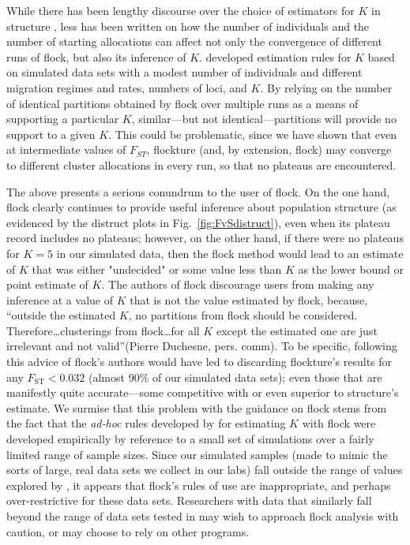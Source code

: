 While there has been lengthy 
discourse over the choice of estimators for $K$ in {\sc structure} 
\citep{Pritchardetal2000,Evannoetal2005,Wap&Gag2006,Gaoetal2011}, less has been written on how the number of 
individuals
and the number of starting allocations can affect not only the convergence of different runs of {\sc flock}, but also its 
inference of $K$. \citeauthor{Duc&Tur2012} developed estimation rules for $K$ based on simulated data 
sets with a modest number of individuals and different migration regimes and rates, numbers of loci, and $K$. 
By relying on the number of identical partitions obtained by {\sc flock} over multiple
runs as a means of supporting 
a particular $K$,  similar---but not identical---partitions
will provide no support to a given $K$. This could be problematic, 
since we have shown that even at intermediate
values of $F_{ST}$,  {\sc flockture} (and, by extension,
{\sc flock}) may converge to 
different cluster allocations in every run, so that no plateaus are encountered. 

The above presents a serious conundrum to the user of {\sc flock}.  On the one hand,
{\sc flock} clearly continues to provide useful inference about population structure
(as evidenced by the {\sc distruct} plots in Fig.~\ref{fig:FvSdistruct}), even when its
plateau record includes no plateaus; however, on the other hand, if there were no
plateaus for $K=5$ in our simulated data, then the {\sc flock} method would lead to an estimate of $K$ that
was either "undecided" or some value less than $K$ as the lower bound or point estimate of $K$. The authors of {\sc flock}
discourage users from making any inference at a value of $K$ that is not
the value estimated by {\sc flock}, because, ``outside the estimated $K$, no partitions from {\sc flock}
 should be considered. Therefore\ldots clusterings from {\sc flock}\ldots for all $K$ except the estimated one are just
 irrelevant and not valid''(Pierre Duchesne, pers. comm).  To be specific, following 
this advice of {\sc flock}'s authors would have led to discarding {\sc flockture}'s
results for any $F_\mathrm{ST} < 0.032$ (almost 90\% of our simulated data sets); even those that are
manifestly quite accurate---some competitive
with or even superior to {\sc structure}'s estimate.  We surmise that this problem with the guidance on 
{\sc flock} stems from the fact that the {\em ad-hoc} rules developed by
\citeauthor{Duc&Tur2012} for estimating $K$ with {\sc flock} were developed empirically
by reference to a small set of simulations over a fairly limited range of sample sizes.  Since our simulated
samples (made to mimic the sorts of large, real data sets we collect in our labs)
fall outside the range of values explored
by \citeauthor{Duc&Tur2012}, it appears that {\sc flock}'s rules of use are inappropriate, 
and perhaps over-restrictive for these data sets.  Researchers with data that similarly fall beyond the range of 
data sets tested in \citet{Duc&Tur2012} may wish to approach {\sc flock} analysis with
caution, or may choose to rely on other programs.


